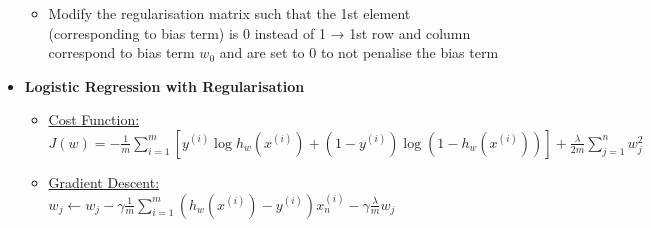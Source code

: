 \documentclass[landscape]{article}
\begin{document}
\begin{multicols*}{5}
\begin{itemize}
\begin{itemize}
            \item Modify the regularisation matrix such that the 1st element (corresponding to bias term) is 0 instead of 1 → 1st row and column correspond to bias term $w_0$ and are set to 0 to not penalise the bias term
          \end{itemize}
          \item \textbf{Logistic Regression with Regularisation}
          \begin{itemize}
            \item \underline{Cost Function:} $J(w) = -\frac{1}{m} \sum_{i=1}^{m} [ y^{(i)} \log h_w(x^{(i)}) +\left( 1 - y^{(i)} \right) \log \left( 1 - h_w(x^{(i)}) \right)] + \frac{\lambda}{2m} \sum_{j=1}^{n} w_j^2$
            \item \underline{Gradient Descent:} $w_j \leftarrow w_j - \gamma \frac{1}{m} \sum_{i=1}^{m} \left( h_w(x^{(i)}) - y^{(i)} \right) x_n^{(i)} - \gamma \frac{\lambda}{m} w_j$
          \end{itemize}
        \end{itemize}


\end{multicols*}
\end{document}
